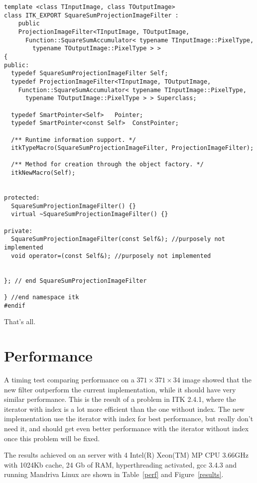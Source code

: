 \documentclass{InsightArticle}
\begin{document}
\small \begin{verbatim}
template <class TInputImage, class TOutputImage>
class ITK_EXPORT SquareSumProjectionImageFilter :
    public
    ProjectionImageFilter<TInputImage, TOutputImage,
      Function::SquareSumAccumulator< typename TInputImage::PixelType,
        typename TOutputImage::PixelType > >
{
public:
  typedef SquareSumProjectionImageFilter Self;
  typedef ProjectionImageFilter<TInputImage, TOutputImage, 
    Function::SquareSumAccumulator< typename TInputImage::PixelType,
      typename TOutputImage::PixelType > > Superclass;

  typedef SmartPointer<Self>   Pointer;
  typedef SmartPointer<const Self>  ConstPointer;

  /** Runtime information support. */
  itkTypeMacro(SquareSumProjectionImageFilter, ProjectionImageFilter);

  /** Method for creation through the object factory. */
  itkNewMacro(Self);


protected:
  SquareSumProjectionImageFilter() {}
  virtual ~SquareSumProjectionImageFilter() {}

private:
  SquareSumProjectionImageFilter(const Self&); //purposely not implemented
  void operator=(const Self&); //purposely not implemented


}; // end SquareSumProjectionImageFilter

} //end namespace itk
#endif
\end{verbatim} \normalsize
That's all.

\section{Performance}

A timing test comparing performance on a $371 \times 371 \times 34$
image showed that the new filter outperform the current implementation,
while it should have very similar performance.
This is the result of a problem in ITK 2.4.1, where the iterator with index
is a lot more efficient than the one without index. The new implementation
use the iterator with index for best performance, but really don't need
it, and should get even better performance with the iterator without
index once this problem will be fixed.

 The results achieved on an server with 4 Intel(R) Xeon(TM) MP CPU 3.66GHz
with 1024Kb cache, 24 Gb of RAM, hyperthreading activated, gcc
3.4.3 and running Mandriva Linux are shown in Table~\ref{perf} and
Figure~\ref{results}.
\end{document}
